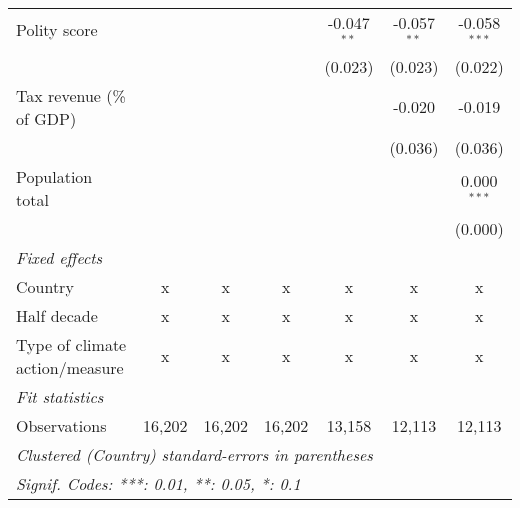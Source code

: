 \begin{tabular}{lcccccc}
   Polity score                                                            &              &              &               & -0.047$^{**}$ & -0.057$^{**}$ & -0.058$^{***}$\\   
                                                                           &              &              &               & (0.023)       & (0.023)       & (0.022)\\   
   Tax revenue (\% of GDP)                                                 &              &              &               &               & -0.020        & -0.019\\   
                                                                           &              &              &               &               & (0.036)       & (0.036)\\   
   Population total                                                        &              &              &               &               &               & 0.000$^{***}$\\   
                                                                           &              &              &               &               &               & (0.000)\\   
   \emph{Fixed effects}\\
   Country                                                                 & x            & x            & x             & x             & x             & x\\  
   Half decade                                                             & x            & x            & x             & x             & x             & x\\  
   Type of climate action/measure                                          & x            & x            & x             & x             & x             & x\\  
   \midrule \emph{Fit statistics}\\
   Observations                                                            & 16,202       & 16,202       & 16,202        & 13,158        & 12,113        & 12,113\\  
   \midrule
   \multicolumn{7}{l}{\emph{Clustered (Country) standard-errors in parentheses}}\\
   \multicolumn{7}{l}{\emph{Signif. Codes: ***: 0.01, **: 0.05, *: 0.1}}\\
\end{tabular}
\par\endgroup


